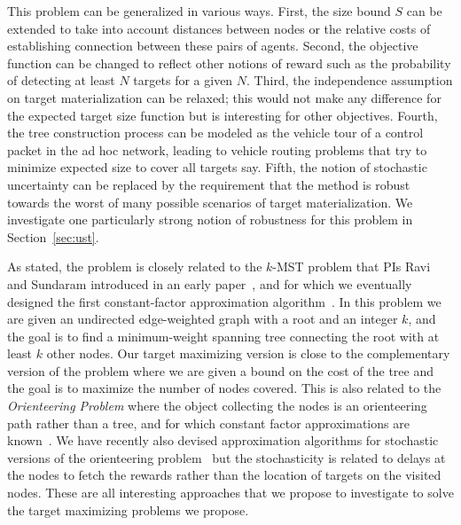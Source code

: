 This problem can be generalized in various ways. First, the size bound
$S$ can be extended to take into account distances between nodes or
the relative costs of establishing connection between these pairs of
agents. Second, the objective function can be changed to reflect other
notions of reward such as the probability of detecting at least $N$
targets for a given $N$. Third, the independence assumption on target
materialization can be relaxed; this would not make any difference for
the expected target size function but is interesting for other
objectives. Fourth, the tree construction process can be modeled as
the vehicle tour of a control packet in the ad hoc network, leading to
vehicle routing problems that try to minimize expected size to cover
all targets say. Fifth, the notion of stochastic uncertainty can be
replaced by the requirement that the method is robust towards the
worst of many possible scenarios of target materialization. We
investigate one particularly strong notion of robustness for this
problem in Section~\ref{sec:ust}.


As stated, the problem is closely related to the $k$-MST problem that
PIs Ravi and Sundaram introduced in an early paper~\cite{RSMRR94}, and
for which we eventually designed the first constant-factor
approximation algorithm~\cite{BRV99}. In this problem we are given an
undirected edge-weighted graph with a root and an integer $k$, and the
goal is to find a minimum-weight spanning tree connecting the root
with at least $k$ other nodes. Our target maximizing version is close
to the complementary version of the problem where we are given a bound
on the cost of the tree and the goal is to maximize the number of
nodes covered. This is also related to the {\em Orienteering Problem}
where the object collecting the nodes is an orienteering path rather
than a tree, and for which constant factor approximations are
known~\cite{BCKLMM03}. We have recently also devised approximation
algorithms for stochastic versions of the orienteering
problem~\cite{GKNR12} but the stochasticity is related to delays at
the nodes to fetch the rewards rather than the location of targets on
the visited nodes. These are all interesting approaches that we
propose to investigate to solve the target maximizing problems we
propose. 

